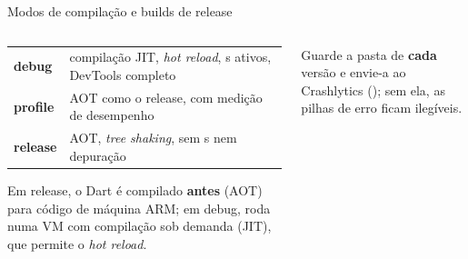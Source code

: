 \documentclass[aspectratio=169,10pt]{beamer}
\begin{document}
\begin{frame}[fragile]{Modos de compilação e builds de release}
  \begin{columns}[T]
    \begin{column}{0.46\textwidth}
      \scriptsize
      \begin{tabularx}{\linewidth}{@{}l L@{}}
        \toprule
         &  \\
        \midrule
        \textbf{debug} & compilação JIT, \emph{hot reload}, s ativos, DevTools completo \\
        \textbf{profile} & AOT como o release, com medição de desempenho \\
        \textbf{release} & AOT, \emph{tree shaking}, sem s nem depuração \\
        \bottomrule
      \end{tabularx}
      \begin{pordentro}
        Em release, o Dart é compilado \textbf{antes} (AOT) para código de máquina ARM; em debug, roda numa VM com compilação sob demanda (JIT), que permite o \emph{hot reload}.
      \end{pordentro}
    \end{column}
    \begin{column}{0.52\textwidth}
      \begin{atencao}
        Guarde a pasta  de \textbf{cada} versão e envie-a ao Crashlytics (); sem ela, as pilhas de erro ficam ilegíveis.
      \end{atencao}
    \end{column}
  \end{columns}
\end{frame}
\end{document}
